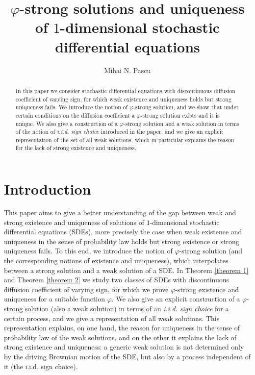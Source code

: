 \documentclass[reqno]{amsart}
\theoremstyle{definition}
\theoremstyle{remark}
\numberwithin{equation}{section}
\begin{document}
\title[$\varphi $-strong solutions and uniqueness of SDE\lowercase{s}]{$\varphi $-strong solutions and uniqueness of $1$-dimensional stochastic
differential equations}

\author{Mihai N. Pascu}
\address{Faculty of Mathematics and Computer Science, Transilvania University of Bra\c{s}ov, Str. Iuliu Maniu Nr. 50, Bra\c{s}ov -- 500091, ROMANIA}
  

\begin{abstract}
In this paper we consider stochastic differential equations with
discontinuous diffusion coefficient of varying sign, for which weak existence and uniqueness holds but strong
uniqueness fails. We introduce the notion of $\varphi $-strong solution, and
we show that under certain conditions on the diffusion coefficient a $\varphi
$-strong solution exists and it is unique. We also give a construction of a $\varphi$-strong solution and a weak solution in terms of the notion of \emph{i.i.d. sign choice} introduced in the paper, and we give an explicit representation of the set of all weak solutions, which in particular explains the reason for the lack of strong existence and uniqueness. 
\end{abstract}
\maketitle

\section{Introduction}

This paper aims to give a better understanding of the gap between weak and strong existence and uniqueness of solutions of $1$-dimensional stochastic differential equations (SDEs), more precisely the case when weak existence and uniqueness in the sense of probability law holds but strong existence or strong uniqueness fails. To this end,  we introduce the notion of $\varphi$-strong solution (and the corresponding notions of existence and uniqueness), which interpolates between a strong solution and a weak solution of a SDE. In Theorem \ref{theorem 1} and Theorem \ref{theorem 2} we study two classes of SDEs with discontinuous diffusion coefficient of varying sign, for which we prove $\varphi$-strong existence and uniqueness for a suitable function $\varphi$. We also give an explicit construction of a $\varphi$-strong solution (also a weak solution) in terms of an \emph{i.i.d. sign choice} for a certain process, and we give a representation of all weak solutions. This representation explains, on one hand, the reason for uniqueness in the sense of probability law of the weak solutions, and on the other it explains the lack of strong existence and uniqueness: a generic weak solution is not determined only by the driving Brownian motion of the SDE, but also by a process independent of it (the i.i.d. sign choice).
\end{document}
